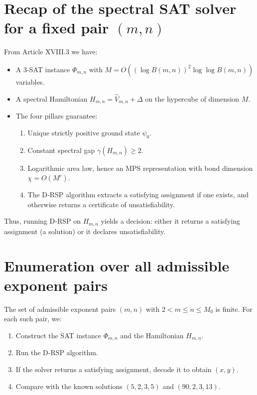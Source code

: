 \documentclass[11pt,a4paper]{article}
\begin{document}
\section{Recap of the spectral SAT solver for a fixed pair \((m,n)\)}

From Article XVIII.3 we have:
\begin{itemize}
\item A 3‑SAT instance \(\Phi_{m,n}\) with \(M = O((\log B(m,n))^2 \log \log B(m,n))\) variables.
\item A spectral Hamiltonian \(H_{m,n} = \hat{V}_{m,n} + \Delta\) on the hypercube of dimension \(M\).
\item The four pillars guarantee:
  \begin{enumerate}
  \item Unique strictly positive ground state \(\psi_0\).
  \item Constant spectral gap \(\gamma(H_{m,n}) \ge 2\).
  \item Logarithmic area law, hence an MPS representation with bond dimension \(\chi = O(M^c)\).
  \item The D‑RSP algorithm extracts a satisfying assignment if one exists, and otherwise returns a certificate of unsatisfiability.
  \end{enumerate}
\end{itemize}
Thus, running D‑RSP on \(H_{m,n}\) yields a decision: either it returns a satisfying assignment (a solution) or it declares unsatisfiability.

\section{Enumeration over all admissible exponent pairs}

The set of admissible exponent pairs \((m,n)\) with \(2<m\le n\le M_0\) is finite. For each such pair, we:
\begin{enumerate}
\item Construct the SAT instance \(\Phi_{m,n}\) and the Hamiltonian \(H_{m,n}\).
\item Run the D‑RSP algorithm.
\item If the solver returns a satisfying assignment, decode it to obtain \((x,y)\).
\item Compare with the known solutions \((5,2,3,5)\) and \((90,2,3,13)\).
\end{enumerate}
\end{document}
